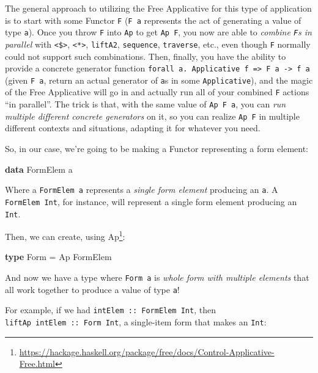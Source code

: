 \documentclass[]{article}
\newenvironment{Shaded}{}{}
\newcommand{\DataTypeTok}[1]{\textcolor[rgb]{0.56,0.13,0.00}{#1}}
\newcommand{\KeywordTok}[1]{\textcolor[rgb]{0.00,0.44,0.13}{\textbf{#1}}}
\newcommand{\NormalTok}[1]{#1}
\newcommand{\OtherTok}[1]{\textcolor[rgb]{0.00,0.44,0.13}{#1}}
\renewcommand{\href}[2]{#2\footnote{\url{#1}}}
\begin{document}
The general approach to utilizing the Free Applicative for this type of
application is to start with some Functor \texttt{F} (\texttt{F\ a} represents
the act of generating a value of type \texttt{a}). Once you throw \texttt{F}
into \texttt{Ap} to get \texttt{Ap\ F}, you now are able to \emph{combine
\texttt{F}s in parallel} with \texttt{\textless{}\$\textgreater{}},
\texttt{\textless{}*\textgreater{}}, \texttt{liftA2}, \texttt{sequence},
\texttt{traverse}, etc., even though \texttt{F} normally could not support such
combinations. Then, finally, you have the ability to provide a concrete
generator function
\texttt{forall\ a.\ Applicative\ f\ =\textgreater{}\ F\ a\ -\textgreater{}\ f\ a}
(given \texttt{F\ a}, return an actual generator of \texttt{a}s in some
\texttt{Applicative}), and the magic of the Free Applicative will go in and
actually run all of your combined \texttt{F} actions ``in parallel''. The trick
is that, with the same value of \texttt{Ap\ F\ a}, you can \emph{run multiple
different concrete generators} on it, so you can realize \texttt{Ap\ F} in
multiple different contexts and situations, adapting it for whatever you need.

So, in our case, we're going to be making a Functor representing a form element:

\begin{Shaded}
\begin{Highlighting}[]
\KeywordTok{data} \DataTypeTok{FormElem}\NormalTok{ a}
\end{Highlighting}
\end{Shaded}

Where a \texttt{FormElem\ a} represents a \emph{single form element} producing
an \texttt{a}. A \texttt{FormElem\ Int}, for instance, will represent a single
form element producing an \texttt{Int}.

Then, we can create, using
\href{https://hackage.haskell.org/package/free/docs/Control-Applicative-Free.html}{Ap}:

\begin{Shaded}
\begin{Highlighting}[]
\KeywordTok{type} \DataTypeTok{Form} \OtherTok{=} \DataTypeTok{Ap} \DataTypeTok{FormElem}
\end{Highlighting}
\end{Shaded}

And now we have a type where \texttt{Form\ a} is \emph{whole form with multiple
elements} that all work together to produce a value of type \texttt{a}!

For example, if we had \texttt{intElem\ ::\ FormElem\ Int}, then
\texttt{liftAp\ intElem\ ::\ Form\ Int}, a single-item form that makes an
\texttt{Int}:
\end{document}
